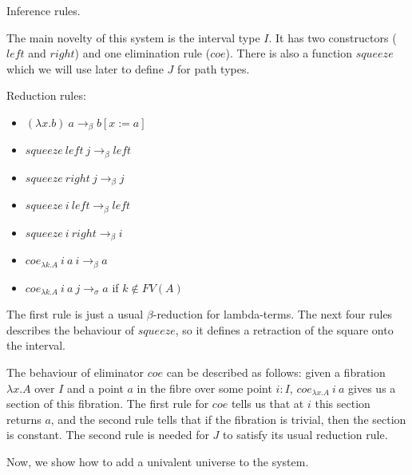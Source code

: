 \documentclass{amsart}
\theoremstyle{definition}
\theoremstyle{remark}
\numberwithin{figure}{section}
\begin{document}
\begin{table}
\begin{comment}
\medskip
\begin{center}
\def\extraVskip{1pt}
\Axiom$\fCenter \Gamma \vdash i : I$
\noLine
\UnaryInf$\fCenter \Gamma \vdash j : I$
\Axiom$\fCenter \Gamma \vdash a : \Pi (y : I) A$
\noLine
\UnaryInf$\fCenter \Gamma \vdash a' : \Pi (y : I) A$
\noLine
\UnaryInf$\fCenter \Gamma \vdash f : I \to A[y := i]$
\def\extraVskip{2pt}
\RightLabel{, $a\ i =_\beta f\ left$, $f\ right =_\beta a'\ i$}
\BinaryInfC{$\Gamma \vdash fill_{\lambda y. A}\ a\ a'\ i\ f\ j : I \to A[y := j]$}
\DisplayProof
\end{center}
\end{comment}

\bigskip
\caption{Inference rules.}
\label{table:inf-rules}
\end{table}

The main novelty of this system is the interval type $I$.
It has two constructors ($left$ and $right$) and one elimination rule ($coe$).
There is also a function $squeeze$ which we will use later to define $J$ for path types.

Reduction rules:
\begin{itemize}
\item $(\lambda x.b)\ a \to_\beta b[x := a]$
\item $squeeze\ left\ j \to_\beta left$
\item $squeeze\ right\ j \to_\beta j$
\item $squeeze\ i\ left \to_\beta left$
\item $squeeze\ i\ right \to_\beta i$
\item $coe_{\lambda k.A}\ i\ a\ i \to_\beta a$
\item $coe_{\lambda k.A}\ i\ a\ j \to_\sigma a$ if $k \notin FV(A)$
\end{itemize}

The first rule is just a usual $\beta$-reduction for lambda-terms.
The next four rules describes the behaviour of $squeeze$, so it defines a retraction of the square onto the interval.

The behaviour of eliminator $coe$ can be described as follows:
given a fibration $\lambda x. A$ over $I$ and a point $a$ in the fibre over some point $i : I$, $coe_{\lambda x. A}\ i\ a$ gives us a section of this fibration.
The first rule for $coe$ tells us that at $i$ this section returns $a$, and the second rule tells that if the fibration is trivial, then the section is constant.
The second rule is needed for $J$ to satisfy its usual reduction rule.

Now, we show how to add a univalent universe to the system.
\end{document}
